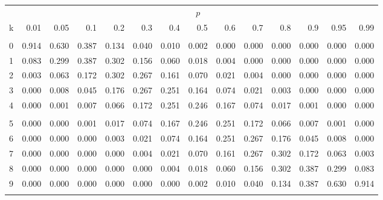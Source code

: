 \documentclass[
]{article}
\begin{document}
\begin{longtable}[t]{lrrrrrrrrrrrrr}
\toprule
\multicolumn{1}{c}{ } & \multicolumn{13}{c}{$p$} \\
\cmidrule(l{3pt}r{3pt}){2-14}
k & 0.01 & 0.05 & 0.1 & 0.2 & 0.3 & 0.4 & 0.5 & 0.6 & 0.7 & 0.8 & 0.9 & 0.95 & 0.99\\
\midrule
\addlinespace[0.3em]
\multicolumn{14}{l}{$n=9$}\\
\hspace{1em}0 & 0.914 & 0.630 & 0.387 & 0.134 & 0.040 & 0.010 & 0.002 & 0.000 & 0.000 & 0.000 & 0.000 & 0.000 & 0.000\\
\hspace{1em}1 & 0.083 & 0.299 & 0.387 & 0.302 & 0.156 & 0.060 & 0.018 & 0.004 & 0.000 & 0.000 & 0.000 & 0.000 & 0.000\\
\hspace{1em}2 & 0.003 & 0.063 & 0.172 & 0.302 & 0.267 & 0.161 & 0.070 & 0.021 & 0.004 & 0.000 & 0.000 & 0.000 & 0.000\\
\hspace{1em}3 & 0.000 & 0.008 & 0.045 & 0.176 & 0.267 & 0.251 & 0.164 & 0.074 & 0.021 & 0.003 & 0.000 & 0.000 & 0.000\\
\hspace{1em}4 & 0.000 & 0.001 & 0.007 & 0.066 & 0.172 & 0.251 & 0.246 & 0.167 & 0.074 & 0.017 & 0.001 & 0.000 & 0.000\\
\addlinespace[-.7em]
\multicolumn{14}{l}{ }\\
\hspace{1em}5 & 0.000 & 0.000 & 0.001 & 0.017 & 0.074 & 0.167 & 0.246 & 0.251 & 0.172 & 0.066 & 0.007 & 0.001 & 0.000\\
\hspace{1em}6 & 0.000 & 0.000 & 0.000 & 0.003 & 0.021 & 0.074 & 0.164 & 0.251 & 0.267 & 0.176 & 0.045 & 0.008 & 0.000\\
\hspace{1em}7 & 0.000 & 0.000 & 0.000 & 0.000 & 0.004 & 0.021 & 0.070 & 0.161 & 0.267 & 0.302 & 0.172 & 0.063 & 0.003\\
\hspace{1em}8 & 0.000 & 0.000 & 0.000 & 0.000 & 0.000 & 0.004 & 0.018 & 0.060 & 0.156 & 0.302 & 0.387 & 0.299 & 0.083\\
\hspace{1em}9 & 0.000 & 0.000 & 0.000 & 0.000 & 0.000 & 0.000 & 0.002 & 0.010 & 0.040 & 0.134 & 0.387 & 0.630 & 0.914\\
\addlinespace[0.3em]
\multicolumn{14}{l}{$n=10$}\\

\end{longtable}
\end{document}
